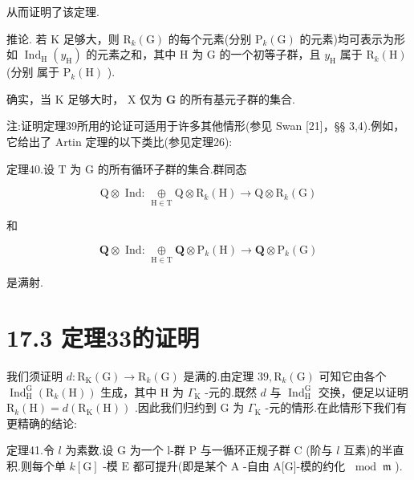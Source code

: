 \documentclass[10pt]{article}
\begin{document}
从而证明了该定理.

推论. 若 \(\mathrm{K}\) 足够大，则 \({\mathrm{R}}_{k}\left( \mathrm{G}\right)\) 的每个元素(分别 \({\mathrm{P}}_{k}\left( \mathrm{G}\right)\) 的元素)均可表示为形如 \({\operatorname{Ind}}_{\mathrm{H}}\left( {y}_{\mathrm{H}}\right)\) 的元素之和，其中 \(\mathrm{H}\) 为 \(\mathrm{G}\) 的一个初等子群，且 \({y}_{\mathrm{H}}\) 属于 \({\mathrm{R}}_{k}\left( \mathrm{H}\right)\) (分别 属于 \({\mathrm{P}}_{k}\left( \mathrm{H}\right)\) ).

确实，当 \(\mathrm{K}\) 足够大时， \(\mathrm{X}\) 仅为 \(\mathbf{G}\) 的所有基元子群的集合.

注:证明定理39所用的论证可适用于许多其他情形(参见 Swan [21]，§§ 3,4).例如，它给出了 Artin 定理的以下类比(参见定理26):

定理40.设 \(\mathrm{T}\) 为 \(\mathrm{G}\) 的所有循环子群的集合.群同态

\[
\mathrm{Q} \otimes  \text{ Ind: }\underset{\mathrm{H} \in  \mathrm{T}}{ \oplus  }\mathrm{Q} \otimes  {\mathrm{R}}_{k}\left( \mathrm{H}\right)  \rightarrow  \mathrm{Q} \otimes  {\mathrm{R}}_{k}\left( \mathrm{G}\right)
\]

和

\[
\mathbf{Q} \otimes  \text{ Ind: }\underset{\mathrm{H} \in  \mathrm{T}}{ \oplus  }\mathbf{Q} \otimes  {\mathrm{P}}_{k}\left( \mathrm{H}\right)  \rightarrow  \mathbf{Q} \otimes  {\mathrm{P}}_{k}\left( \mathrm{G}\right)
\]

是满射.

\section*{17.3 定理33的证明}

我们须证明 \(d : {\mathrm{R}}_{\mathrm{K}}\left( \mathrm{G}\right)  \rightarrow  {\mathrm{R}}_{k}\left( \mathrm{G}\right)\) 是满的.由定理 \({39},{\mathrm{R}}_{k}\left( \mathrm{G}\right)\) 可知它由各个 \({\operatorname{Ind}}_{\mathrm{H}}^{\mathrm{G}}\left( {{\mathrm{R}}_{k}\left( \mathrm{H}\right) }\right)\) 生成，其中 \(\mathrm{H}\) 为 \({\Gamma }_{\mathrm{K}}\) -元的.既然 \(d\) 与 \({\operatorname{Ind}}_{\mathrm{H}}^{\mathrm{G}}\) 交换，便足以证明 \({\mathrm{R}}_{k}\left( \mathrm{H}\right)  = d\left( {{\mathrm{R}}_{\mathrm{K}}\left( \mathrm{H}\right) }\right)\) .因此我们归约到 \(\mathrm{G}\) 为 \({\Gamma }_{\mathrm{K}}\) -元的情形.在此情形下我们有更精确的结论:

定理41.令 \(l\) 为素数.设 \(\mathrm{G}\) 为一个 l-群 \(\mathrm{P}\) 与一循环正规子群 \(\mathrm{C}\) (阶与 \(l\) 互素)的半直积.则每个单 \(k\left\lbrack  \mathrm{G}\right\rbrack\) -模 \(\mathrm{E}\) 都可提升(即是某个 \(\mathrm{A}\) -自由 A[G]-模的约化 \({\;\operatorname{mod}\;\mathfrak{m}}\) ).
\end{document}
